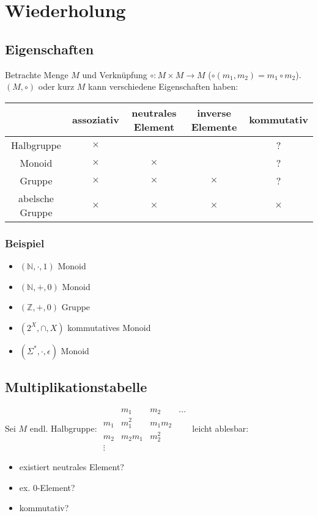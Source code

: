 \section{Wiederholung}
    \subsection{Eigenschaften}
    Betrachte Menge $M$ und Verknüpfung $\circ: M\times M\rightarrow M$ ($\circ(m_1,m_2)=m_1\circ m_2$).\\
    $(M,\circ)$ oder kurz $M$ kann verschiedene Eigenschaften haben:\\
    \begin{tabular}{c|cccc}
     & assoziativ & neutrales Element & inverse Elemente & kommutativ\\\hline
     Halbgruppe & $\times$ & && ?\\
     Monoid & $\times$ & $\times$ & & ?\\
     Gruppe & $\times$ & $\times$ & $\times$ & ?\\
     abelsche Gruppe & $\times$ & $\times$ & $\times$ &$\times$
    \end{tabular}
        \subsubsection{Beispiel}
            \begin{itemize}
                \item $(\mathds{N},\cdot,1)$ Monoid
                \item $(\mathds{N},+,0)$ Monoid
                \item $(\mathds{Z},+,0)$ Gruppe
                \item $(2^X,\cap,X)$ kommutatives Monoid
                \item $(\Sigma^*,\cdot,\epsilon)$ Monoid
            \end{itemize}
    \subsection{Multiplikationstabelle}
    Sei $M$ endl. Halbgruppe: \begin{math}
        \begin{array}
            {c|ccc}
            & m_1 & m_2 & \dots\\\hline
            m_1 & m_1^2 & m_1m_2 &\\
            m_2 & m_2m_1 & m_2^2 &\\
            \vdots &
        \end{array}
    \end{math}
    leicht ablesbar:
    \begin{itemize}
        \item existiert neutrales Element?
        \item ex. 0-Element?
        \item kommutativ?
    \end{itemize}
